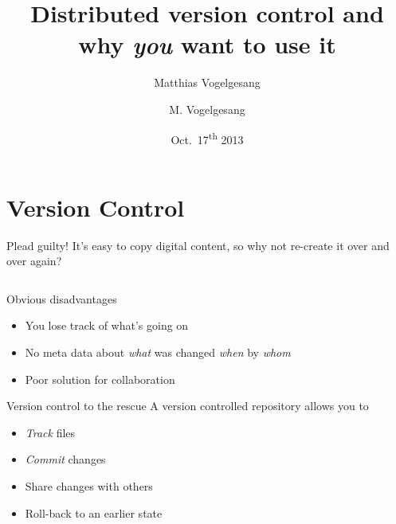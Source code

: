 \documentclass[18pt]{beamer}
\title{Distributed version control and why \emph{you} want to use it}
\author{M. Vogelgesang}
\subtitle{Matthias Vogelgesang}
\institute{Institute for Data Processing and Electronics}
\date{Oct.~17\textsuperscript{th} 2013}
\begin{document}
\maketitle

\section{Version Control}

\begin{frame}{Plead guilty!}
  It's easy to copy digital content, so why not re-create it over and over
  again?

  \begin{columns}[onlytextwidth]

  \end{columns}
\end{frame}
\begin{frame}{Obvious disadvantages}
  \begin{itemize}
    \item You lose track of what's going on
    \item No meta data about \emph{what} was changed \emph{when} by
      \emph{whom}
    \item Poor solution for collaboration
  \end{itemize}
\end{frame}
\begin{frame}{Version control to the rescue}
  A version controlled repository allows you to
  \begin{itemize}
    \item \emph{Track} files
    \item \emph{Commit} changes
    \item Share changes with others
    \item Roll-back to an earlier state
  \end{itemize}
\end{frame}
\end{document}
